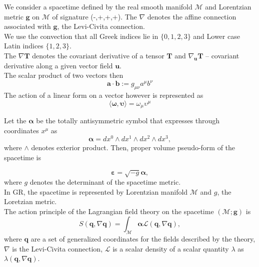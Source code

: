 \documentclass[11pt,a4paper,headinclude=true,DIV=14,BCOR=8mm,chapterprefix,listof=totoc,twoside,openright,abstracton]{scrbook}
\begin{document}
We consider a spacetime defined by the real smooth manifold $\mathcal{M}$ and Lorentzian metric $\boldsymbol{g}$ on $\mathcal{M}$ of signature (-,+,+,+). The $\nabla$ denotes the affine connection associated with $\boldsymbol{g}$, the Levi-Civita connection. \\
We use the convection that all Greek indices lie in $\{0, 1, 2, 3\}$ and Lower case Latin indices $\{1, 2, 3\}$. \\
The $\nabla\boldsymbol{T}$ denotes the covariant derivative of a tensor $\boldsymbol{T}$ and $\nabla_{\boldsymbol{u}}\boldsymbol{T}$ -- covariant derivative along a given vector field $\boldsymbol{u}$.\\
The scalar product of two vectors then 
\begin{equation}
    \boldsymbol{a}\cdot\boldsymbol{b}:=g_{\mu\nu}a^{\mu}b^{\nu}
\end{equation}
The action of a linear form on a vector however is represented as 
\begin{equation}
    \langle\boldsymbol{\omega},\boldsymbol{\upsilon}\rangle=\omega_{\mu}\upsilon^{\mu}
\end{equation}

Let the $\boldsymbol{\alpha}$ be the totally antisymmetric symbol that expresses through coordinates $x^{\mu}$ as
\begin{equation}
    \boldsymbol{\alpha} = dx^0 \wedge dx^1 \wedge dx^2 \wedge dx^3,
\end{equation}
where $\wedge$ denotes exterior product. Then, proper volume pseudo-form of the spacetime is

\begin{equation}
    \boldsymbol{\varepsilon} = \sqrt{-g}\boldsymbol{\alpha},
\end{equation}
where $g$ denotes the determinant of the spacetime metric. \\

In GR, the spacetime is represented by Lorentzian manifold $\mathcal{M}$ and $g$, the Loretzian metric. \\

The action principle of the Lagrangian field theory on the spacetime $(\mathcal{M}; \boldsymbol{g})$ is
\begin{equation}
    S(\boldsymbol{q}, \nabla\boldsymbol{q}) = \int_{\mathcal{M}}\boldsymbol{\alpha}\mathcal{L}(\boldsymbol{q}, \nabla\boldsymbol{q}),
\end{equation}
where $\boldsymbol{q}$ are a set of generalized coordinates for the fields described by the theory, $\nabla$ is the Levi-Civita connection, $\mathcal{L}$ is a scalar density of a scalar quantity $\lambda$ as $\lambda(\boldsymbol{q},\nabla\boldsymbol{q})$. 
\end{document}
